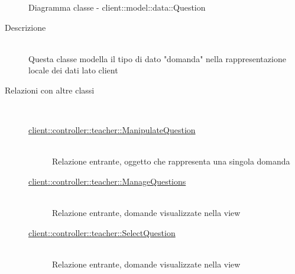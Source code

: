 \vspace{0.5cm}
\hypertarget{client::model::data::Question}{}
\begin{figure}[H]
	\centering
	\caption{Diagramma classe - client::model::data::Question}
\end{figure}\begin{description}
\item[Descrizione] \hfill \\
Questa classe modella il tipo di dato "domanda" nella rappresentazione locale dei dati lato client
\item[Relazioni con altre classi] \hfill \\
\vspace{-7mm}
\begin{description}
	\item[\hyperlink{client::controller::teacher::ManipulateQuestion}{client::controller::teacher::ManipulateQuestion}] \hfill \\
	Relazione entrante, oggetto che rappresenta una singola domanda
	\item[\hyperlink{client::controller::teacher::ManageQuestions}{client::controller::teacher::ManageQuestions}] \hfill \\
	Relazione entrante, domande visualizzate nella view
	\item[\hyperlink{client::controller::teacher::SelectQuestion}{client::controller::teacher::SelectQuestion}] \hfill \\
	Relazione entrante, domande visualizzate nella view
\end{description}


\end{description}
